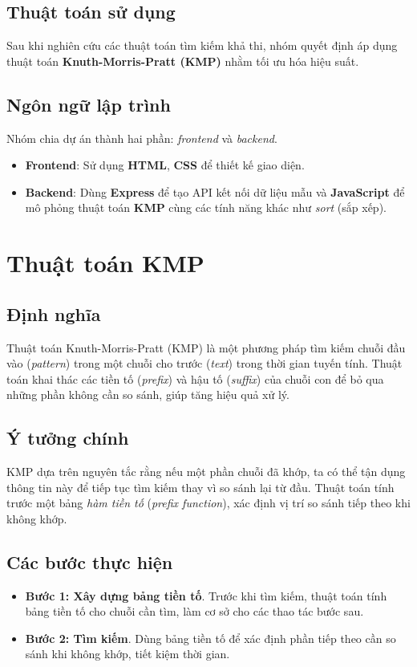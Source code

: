 \subsection{Thuật toán sử dụng}
Sau khi nghiên cứu các thuật toán tìm kiếm khả thi, nhóm quyết định áp dụng thuật toán \textbf{Knuth-Morris-Pratt (KMP)} nhằm tối ưu hóa hiệu suất.

\subsection{Ngôn ngữ lập trình}
Nhóm chia dự án thành hai phần: \textit{frontend} và \textit{backend}.
\begin{itemize}
\item \textbf{Frontend}: Sử dụng \textbf{HTML}, \textbf{CSS} để thiết kế giao diện.
\item \textbf{Backend}: Dùng \textbf{Express} để tạo API kết nối dữ liệu mẫu và \textbf{JavaScript} để mô phỏng thuật toán \textbf{KMP} cùng các tính năng khác như \textit{sort} (sắp xếp).
\end{itemize}

\section{Thuật toán KMP}
\subsection{Định nghĩa}
Thuật toán Knuth-Morris-Pratt (KMP) là một phương pháp tìm kiếm chuỗi đầu vào (\textit{pattern}) trong một chuỗi cho trước (\textit{text}) trong thời gian tuyến tính. Thuật toán khai thác các tiền tố (\textit{prefix}) và hậu tố (\textit{suffix}) của chuỗi con để bỏ qua những phần không cần so sánh, giúp tăng hiệu quả xử lý.

\subsection{Ý tưởng chính}
KMP dựa trên nguyên tắc rằng nếu một phần chuỗi đã khớp, ta có thể tận dụng thông tin này để tiếp tục tìm kiếm thay vì so sánh lại từ đầu. Thuật toán tính trước một bảng \textit{hàm tiền tố} (\textit{prefix function}), xác định vị trí so sánh tiếp theo khi không khớp.

\subsection{Các bước thực hiện}
\begin{itemize}
\item \textbf{Bước 1: Xây dựng bảng tiền tố}. Trước khi tìm kiếm, thuật toán tính bảng tiền tố cho chuỗi cần tìm, làm cơ sở cho các thao tác bước sau.
\item \textbf{Bước 2: Tìm kiếm}. Dùng bảng tiền tố để xác định phần tiếp theo cần so sánh khi không khớp, tiết kiệm thời gian.
\end{itemize}

